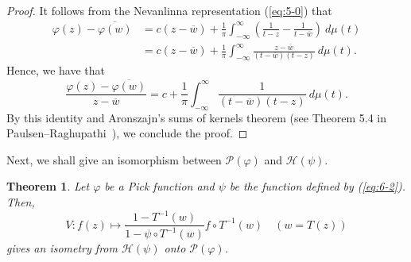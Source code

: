 \documentclass[12pt]{article}
\newtheorem{thm}{Theorem}[section]
\numberwithin{equation}{section}
\newcommand{\cP}{{\mathcal P}}
\newcommand{\cH}{{\mathcal H}}
\begin{document}
\begin{proof}
It follows from the Nevanlinna representation (\ref{eq:5-0}) that 
\begin{align*}
\varphi(z)-\overline{\varphi(w)}
&=c(z-\overline{w})+\frac{1}{\pi}\int_{-\infty}^{\infty}\left( \frac{1}{t-z}-\frac{1}{t-\overline{w}}\right)\ d\mu(t)\\
&=c(z-\overline{w})+\frac{1}{\pi}\int_{-\infty}^{\infty}\frac{z-\overline{w}}{(t-\overline{w})(t-z)}\ d\mu(t).
\end{align*}
Hence, we have that 
\begin{equation*}
\frac{\varphi(z)-\overline{\varphi(w)}}{z-\overline{w}}
=c+\frac{1}{\pi}\int_{-\infty}^{\infty}\frac{1}{(t-\overline{w})(t-z)}\ d\mu(t).
\end{equation*}
By this identity and Aronszajn's sums of kernels theorem  
(see Theorem 5.4 in Paulsen--Raghupathi~\cite{PR}), we conclude the proof.
\end{proof}

Next, we shall give an isomorphism between $\cP(\varphi)$ and $\cH(\psi)$. 
\begin{thm}\label{lem:6-3}
Let $\varphi$ be a Pick function and $\psi$ be the function defined by (\ref{eq:6-2}). 
Then, 
\[
V: f(z)\mapsto \frac{1-T^{-1}(w)}{1-\psi\circ T^{-1}(w)}f\circ T^{-1}(w)\quad (w=T(z))
\]
gives an isometry from $\cH(\psi)$ onto $\cP(\varphi)$.   
\end{thm}
\end{document}
